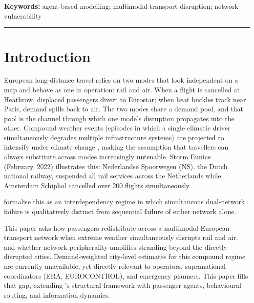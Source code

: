 \documentclass[12pt,a4paper]{article}
\begin{document}
\vspace{0.3em}
\noindent\textbf{Keywords:} agent-based modelling; multimodal transport disruption; network vulnerability

\vspace{0.4em}
\noindent\rule{\textwidth}{0.2pt}
\vspace{0em}

\section{Introduction}

European long-distance travel relies on two modes that look independent on a map and
behave as one in operation: rail and air.
When a flight is cancelled at Heathrow, displaced passengers divert to Eurostar;
when heat buckles track near Paris, demand spills back to air.
The two modes share a demand pool, and that pool is the channel through which one mode's
disruption propagates into the other.
Compound weather events (episodes in which a single climatic driver simultaneously
degrades multiple infrastructure systems) are projected to intensify under climate change
\citep{Zscheischler2020, IPCC2023}, making the assumption that travellers can always
substitute across modes increasingly untenable.
Storm Eunice (February~2022) illustrates this: Nederlandse Spoorwegen (NS), the Dutch national
railway, suspended all rail services across the Netherlands while Amsterdam Schiphol
cancelled over 200 flights simultaneously.

\citet{Buldyrev2010} formalise this as an interdependency regime in which simultaneous
dual-network failure is qualitatively distinct from sequential failure of either network alone.

This paper asks how passengers redistribute across a multimodal European transport network
when extreme weather simultaneously disrupts rail and air, and whether network peripherality
amplifies stranding beyond the directly-disrupted cities.
Demand-weighted city-level estimates for this compound regime are currently unavailable,
yet directly relevant to operators, supranational coordinators (ERA, EUROCONTROL), and emergency planners.
This paper fills that gap, extending \citet{Ippolito2024}'s structural framework with passenger agents, behavioural routing, and information dynamics.

\end{document}
